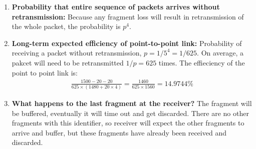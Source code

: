 \documentclass[11pt]{article}
\begin{document}
\begin{enumerate}[1.]
\begin{enumerate}
  \item 
    \textbf{
      Probability that entire sequence of packets arrives 
      without retransmission: 
    }
    Because any fragment loss will result in retransmission of the whole packet, the probability is $p^4$.

  \item 
    \textbf{
      Long-term expected efficiency of point-to-point link:
    }
    Probability of receiving a packet without retransmission, $p = {1/5}^4 = 1/625$. On average, a pakcet will need to be retransmitted $1/p = 625$ times.
    The effieciency of the point to point link is:
    \begin{align*}
      \frac{1500-20-20}{625 \times (1480 + 20 \times 4)} =
      \frac{1460}{625 \times 1560} = 14.9744\%
    \end{align*}

  \item 
    \textbf{
      What happens to the last fragment at the receiver?
    }   
    The fragment will be buffered, eventually it will time out and get discarded. There are no other fragments with this identifier, so receiver will expect the other fragments to arrive and buffer, but these fragments have already been received and discarded.
  \end{enumerate} 
\end{enumerate}
\end{document}
